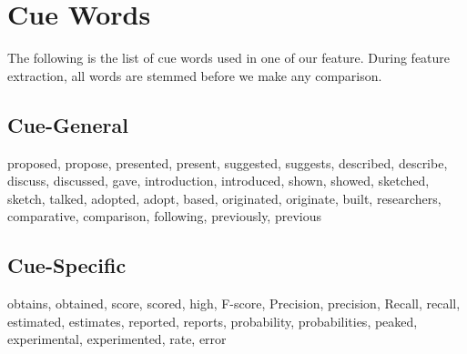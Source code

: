 \chapter{Cue Words}
\label{cuewords}
The following is the list of cue words used in one of our feature. During feature extraction, all words are stemmed before we make any comparison.
\section{Cue-General}
proposed, propose, presented, present, suggested, suggests, described, describe, discuss, discussed, gave, introduction, introduced, shown, showed, sketched, sketch, talked, adopted, adopt, based, originated, originate, built, researchers, comparative, comparison, following, previously, previous

\section{Cue-Specific}
obtains, obtained, score, scored, high, F-score, Precision, precision, Recall, recall, estimated, estimates, reported, reports, probability, probabilities, peaked, experimental, experimented, rate, error

